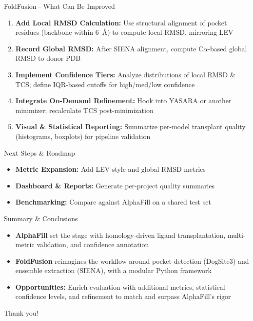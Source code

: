 \documentclass[aspectratio=169]{beamer}
\begin{document}
\begin{frame}{FoldFusion - What Can Be Improved}
    \begin{enumerate}
        \item \textbf{Add Local RMSD Calculation:} Use structural alignment of pocket residues (backbone within 6~\AA) to compute local RMSD, mirroring LEV
        \item \textbf{Record Global RMSD:} After SIENA alignment, compute C$\alpha$-based global RMSD to donor PDB
        \item \textbf{Implement Confidence Tiers:} Analyze distributions of local RMSD \& TCS; define IQR-based cutoffs for high/med/low confidence
        \item \textbf{Integrate On-Demand Refinement:} Hook into YASARA or another minimizer; recalculate TCS post-minimization
        \item \textbf{Visual \& Statistical Reporting:} Summarize per-model transplant quality (histograms, boxplots) for pipeline validation
    \end{enumerate}
\end{frame}

\begin{frame}{Next Steps \& Roadmap}
    \begin{itemize}
        \item \textbf{Metric Expansion:} Add LEV-style and global RMSD metrics
        \item \textbf{Dashboard \& Reports:} Generate per-project quality summaries
        \item \textbf{Benchmarking:} Compare against AlphaFill on a shared test set
    \end{itemize}
\end{frame}

\begin{frame}{Summary \& Conclusions}
    \begin{itemize}
        \item \textbf{AlphaFill} set the stage with homology-driven ligand transplantation, multi-metric validation, and confidence annotation
        \item \textbf{FoldFusion} reimagines the workflow around pocket detection (DogSite3) and ensemble extraction (SIENA), with a modular Python framework
        \item \textbf{Opportunities:} Enrich evaluation with additional metrics, statistical confidence levels, and refinement to match and surpass AlphaFill's rigor
    \end{itemize}
\end{frame}

\begin{frame}
    \centering
    \Huge{Thank you!}
\end{frame}
\end{document}
